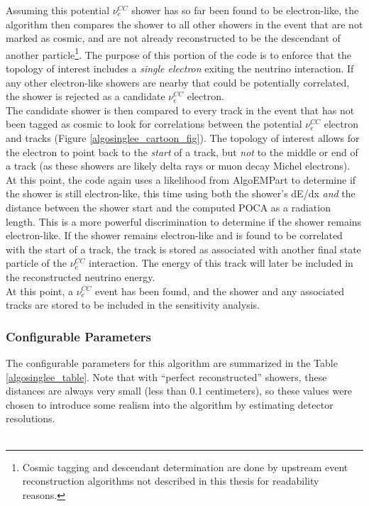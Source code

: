 Assuming this potential $\nu_e^{CC}$ shower has so far been found to be electron-like, the algorithm then compares the shower to all other showers in the event that are not marked as cosmic, and are not already reconstructed to be the descendant of another particle\footnote{Cosmic tagging and descendant determination are done by upstream event reconstruction algorithms not described in this thesis for readability reasons.}. The purpose of this portion of the code is to enforce that the topology of interest includes a \textit{single electron} exiting the neutrino interaction. If any other electron-like showers are nearby that could be potentially correlated, the shower is rejected as a candidate $\nu_e^{CC}$ electron.\\

The candidate shower is then compared to every track in the event that has not been tagged as cosmic to look for correlations between the potential $\nu_e^{CC}$ electron and tracks (Figure \ref{algosinglee_cartoon_fig}). The topology of interest allows for the electron to point back to the \textit{start} of a track, but \textit{not} to the middle or end of a track (as these showers are likely delta rays or muon decay Michel electrons). At this point, the code again uses a likelihood from AlgoEMPart to determine if the shower is still electron-like, this time using both the shower's dE/dx \textit{and} the distance between the shower start and the computed POCA as a radiation length. This is a more powerful discrimination to determine if the shower remains electron-like. If the shower remains electron-like and is found to be correlated with the start of a track, the track is stored as associated with another final state particle of the $\nu_e^{CC}$ interaction. The energy of this track will later be included in the reconstructed neutrino energy.\\

At this point, a $\nu_e^{CC}$ event has been found, and the shower and any associated tracks are stored to be included in the sensitivity analysis.

\subsubsection{Configurable Parameters}
The configurable parameters for this algorithm are summarized in the Table \ref{algosinglee_table}. Note that with ``perfect reconstructed'' showers, these distances are always very small (less than 0.1 centimeters), so these values were chosen to introduce some realism into the algorithm by estimating detector resolutions.\\\\

